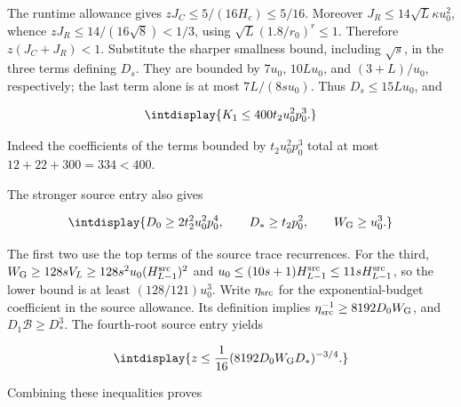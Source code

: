 
The runtime allowance gives \(zJ_C\le5/(16H_c)\le5/16\). Moreover \(J_R\le14\sqrt L\kappa u_0^2\), whence \(zJ_R\le14/(16\sqrt8)<1/3\), using \(\sqrt L(1.8/r_0)^r\le1\). Therefore \(z(J_C+J_R)<1\). Substitute the sharper smallness bound, including \(\sqrt s\), in the three terms defining \(D_s\). They are bounded by \(7u_0\), \(10Lu_0\), and \((3+L)/u_0\), respectively; the last term alone is at most \(7L/(8su_0)\). Thus \(D_s\le15Lu_0\), and


\begingroup\renewcommand{\theHequation}{intdisplay.613}
\begin{equation}
\intdisplay{
K_1\le400t_2u_0^2p_0^3.
}
\label{int:eq-0261-harmonic-polynomial-coefficient-bound}
\end{equation}
\endgroup


Indeed the coefficients of the terms bounded by \(t_2u_0^2p_0^3\) total at most \(12+22+300=334<400\).



The stronger source entry also gives


\begingroup\renewcommand{\theHequation}{intdisplay.614}
\begin{equation*}
\intdisplay{
D_0\ge2t_2^2u_0^2p_0^4,\qquad D_*\ge t_2p_0^2,
\qquad W_{\rm G}\ge u_0^3.
}
\end{equation*}
\endgroup


The first two use the top terms of the source trace recurrences. For the third, \(W_{\rm G}\ge128sV_L\ge128s^2u_0(H_{L-1}^{\rm src})^2\) and \(u_0\le(10s+1)H_{L-1}^{\rm src}\le11sH_{L-1}^{\rm src}\), so the lower bound is at least \((128/121)u_0^3\). Write \(\eta_{\rm src}\) for the exponential-budget coefficient in the source allowance. Its definition implies \(\eta_{\rm src}^{-1}\ge8192D_0W_{\rm G}\), and \(D_1\mathcal B\ge D_*^3\). The fourth-root source entry yields


\begingroup\renewcommand{\theHequation}{intdisplay.615}
\begin{equation*}
\intdisplay{
z\le\frac1{16}(8192D_0W_{\rm G}D_*)^{-3/4}.
}
\end{equation*}
\endgroup


Combining these inequalities proves


